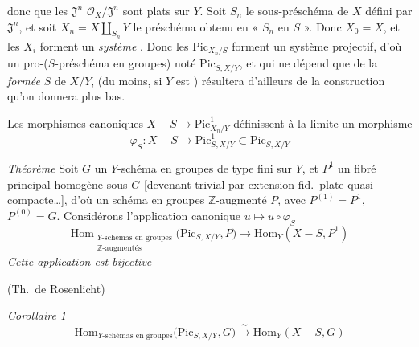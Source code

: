 \documentclass[11pt,a4paper]{article}
\begin{document}
donc   
que les $\mathfrak{J}^{n}$ \ill{} \ill{} $\mathcal{O}_X/\mathfrak{J}^{n}$
sont \ill{} plats sur $Y$. Soit \struck{\ill{}} $S_n$ le
sous-préschéma de $X$ défini par $\mathfrak{J}^{n}$, et soit
$X_n = X \amalg_{S_n} Y$ le \struck{\ill{}} préschéma obtenu en
«  $S_n$ en $S$ ».  Donc $X_0 = X$, et les $X_i$ forment
un \emph{système}  . Donc les
$\mathrm{Pic}_{X_n/S}$ forment un système 
projectif, d'où un pro-($S$-préschéma en groupes) noté
$\mathrm{Pic}_{S,X/Y}$, et qui ne dépend que de la 
\emph{formée} $S$ de $X/Y$, \ill{} \ill{} \ill{} (du moins, si $Y$ est
\ill{} ) \ill{} résultera d'ailleurs de la
construction qu'on donnera plus bas.



Les morphismes canoniques $X - S \to \mathrm{Pic}^{1}_{X_n/Y}$ définissent à
la limite un morphisme
\[
\boxed{\varphi_S \colon X - S \longrightarrow \mathrm{Pic}^{1}_{S, X/Y} \subset \mathrm{Pic}_{S, X/Y}}
\]

\emph{Théorème} Soit $G$ un $Y$-schéma en groupes  de
type fini \struck{\ill{}} sur $Y$, et $P^{1}$ un fibré principal homogène
sous $G$ [devenant trivial par extension fid.\ plate quasi-compacte\ldots],
d'où un schéma en groupes $\mathbb{Z}$-augmenté $P$, avec $P^{(1)} = P^{1}$,
$P^{(0)} = G$. Considérons l'application canonique $u \mapsto u \circ
\varphi_S$
\[
\mathrm{Hom}_{\substack{Y\text{-schémas en groupes}\\ \mathbb{Z}\text{-augmentés}}}\bigl(\mathrm{Pic}_{S, X/Y}, P\bigr) \longrightarrow \mathrm{Hom}_Y(X - S, P^{1})
\]
\emph{Cette application est bijective}

(Th.\ de Rosenlicht)

\emph{Corollaire 1}
\[
\mathrm{Hom}_{Y\text{-schémas en groupes}}\bigl(\mathrm{Pic}_{S, X/Y}, G\bigr) \xrightarrow{\ \sim\ } \mathrm{Hom}_Y(X - S, G)
\]
\end{document}
